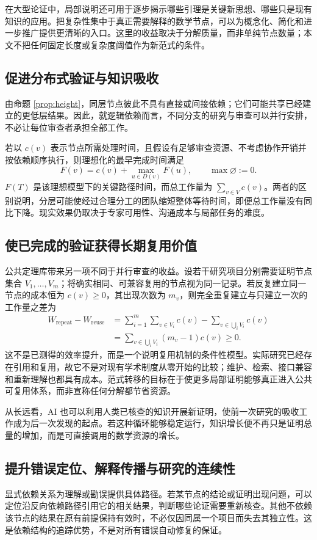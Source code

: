 \documentclass[UTF8,11pt,a4paper,fontset=fandol]{ctexart}
\theoremstyle{definition}\newtheorem{definition}{定义}
\begin{document}
在大型论证中，局部说明还可用于逐步揭示哪些引理是关键新思想、哪些只是现有知识的应用。把复杂性集中于真正需要解释的数学节点，可以为概念化、简化和进一步推广提供更清晰的入口。这里的收益取决于分解质量，而非单纯节点数量；本文不把任何固定长度或复杂度阈值作为新范式的条件。

\subsection{促进分布式验证与知识吸收}
由命题 \ref{prop:height}，同层节点彼此不具有直接或间接依赖；它们可能共享已经建立的更低层结果。因此，就逻辑依赖而言，不同分支的研究与审查可以并行安排，不必让每位审查者承担全部工作。

若以 $c(v)$ 表示节点所需处理时间，且假设有足够审查资源、不考虑协作开销并按依赖顺序执行，则理想化的最早完成时间满足
\[
 F(v)=c(v)+\max_{u\in D(v)}F(u),\qquad \max\varnothing:=0.
\]
$F(T)$ 是该理想模型下的关键路径时间，而总工作量为 $\sum_{v\in V}c(v)$。两者的区别说明，分层可能使经过合理分工的团队缩短整体等待时间，即便总工作量没有同比下降。现实效果仍取决于专家可用性、沟通成本与局部任务的难度。

\subsection{使已完成的验证获得长期复用价值}
公共定理库带来另一项不同于并行审查的收益。设若干研究项目分别需要证明节点集合 $V_1,\ldots,V_m$；将确实相同、可兼容复用的节点视为同一记录。若反复建立同一节点的成本恒为 $c(v)\ge0$，其出现次数为 $m_v$，则完全重复建立与只建立一次的工作量之差为
\begin{align*}
 W_{\mathrm{repeat}}-W_{\mathrm{reuse}}
 &=\sum_{i=1}^m\sum_{v\in V_i}c(v)-\sum_{v\in\bigcup_i V_i}c(v)\\
 &=\sum_{v\in\bigcup_i V_i}(m_v-1)c(v)\ge0.
\end{align*}
这不是已测得的效率提升，而是一个说明复用机制的条件性模型。实际研究已经存在引用和复用，故它不是对现有学术制度从零开始的比较；维护、检索、接口兼容和重新理解也都具有成本。范式转移的目标在于使更多局部证明能够真正进入公共可复用体系，而非宣称任何分解都节省资源。

从长远看，AI 也可以利用人类已核查的知识开展新证明，使前一次研究的吸收工作成为后一次发现的起点。若这种循环能够稳定运行，知识增长便不再只是证明总量的增加，而是可直接调用的数学资源的增长。

\subsection{提升错误定位、解释传播与研究的连续性}
显式依赖关系为理解或勘误提供具体路径。若某节点的结论或证明出现问题，可以定位沿反向依赖路径引用它的相关结果，判断哪些论证需要重新核查。其他不依赖该节点的结果在原有前提保持有效时，不必仅因同属一个项目而失去其独立性。这是依赖结构的追踪优势，不是对所有错误自动修复的保证。
\end{document}
